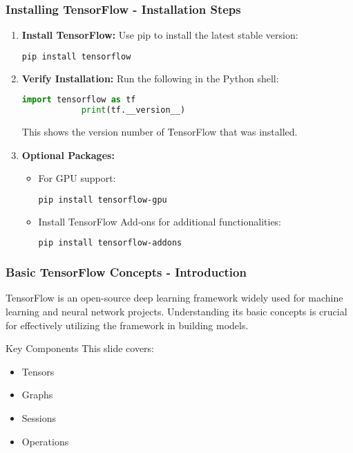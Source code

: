\documentclass[aspectratio=169]{beamer}
\begin{document}
\begin{frame}[fragile]
    \frametitle{Installing TensorFlow - Installation Steps}
    \begin{enumerate}
        \item \textbf{Install TensorFlow:} Use pip to install the latest stable version:
        \begin{lstlisting}[language=bash]
            pip install tensorflow
        \end{lstlisting}
        
        \item \textbf{Verify Installation:} Run the following in the Python shell:
        \begin{lstlisting}[language=Python]
            import tensorflow as tf
            print(tf.__version__)
        \end{lstlisting}
        This shows the version number of TensorFlow that was installed.
        
        \item \textbf{Optional Packages:}
        \begin{itemize}
            \item For GPU support:
            \begin{lstlisting}[language=bash]
                pip install tensorflow-gpu
            \end{lstlisting}
            \item Install TensorFlow Add-ons for additional functionalities:
            \begin{lstlisting}[language=bash]
                pip install tensorflow-addons
            \end{lstlisting}
        \end{itemize}
    \end{enumerate}
\end{frame}

\begin{frame}[fragile]
    \frametitle{Basic TensorFlow Concepts - Introduction}
    TensorFlow is an open-source deep learning framework widely used for machine learning and neural network projects. Understanding its basic concepts is crucial for effectively utilizing the framework in building models.
    
    \begin{block}{Key Components}
        This slide covers:
        \begin{itemize}
            \item Tensors
            \item Graphs
            \item Sessions
            \item Operations
        \end{itemize}
    \end{block}
\end{frame}
\end{document}
